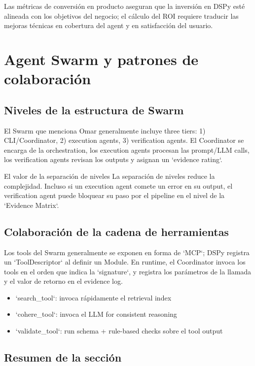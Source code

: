 \documentclass[a4paper]{article}
\begin{document}
Las métricas de conversión en producto aseguran que la inversión en DSPy esté alineada con los objetivos del negocio; el cálculo del ROI requiere traducir las mejoras técnicas en cobertura del agent y en satisfacción del usuario.
\section{Agent Swarm y patrones de colaboración}

\subsection{Niveles de la estructura de Swarm}

El Swarm que menciona Omar generalmente incluye three tiers: 1) CLI/Coordinator, 2) execution agents, 3) verification agents. El Coordinator se encarga de la orchestration, los execution agents procesan las prompt/LLM calls, los verification agents revisan los outputs y asignan un `evidence rating`.

\begin{importantbox}{El valor de la separación de niveles}
La separación de niveles reduce la complejidad. Incluso si un execution agent comete un error en su output, el verification agent puede bloquear su paso por el pipeline en el nivel de la `Evidence Matrix`.
\end{importantbox}

\subsection{Colaboración de la cadena de herramientas}

Los tools del Swarm generalmente se exponen en forma de `MCP`; DSPy registra un `ToolDescriptor` al definir un Module. En runtime, el Coordinator invoca los tools en el orden que indica la `signature`, y registra los parámetros de la llamada y el valor de retorno en el evidence log.

\begin{itemize}
    \item `search\_tool`: invoca rápidamente el retrieval index
    \item `cohere\_tool`: invoca el LLM for consistent reasoning
    \item `validate\_tool`: run schema + rule-based checks sobre el tool output
\end{itemize}

\subsection{Resumen de la sección}
\end{document}
